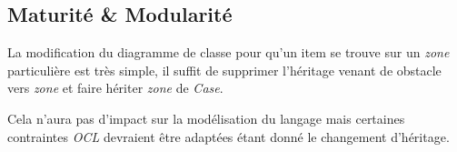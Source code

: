 
\subsection{Maturité & Modularité}
\label{sec:question-22}

La modification du diagramme de classe pour qu'un item se trouve sur un \emph{zone} particulière est très simple, il suffit de supprimer l'héritage venant de obstacle vers \emph{zone} et 
faire hériter \emph{zone} de \emph{Case}.

Cela n'aura pas d'impact sur la modélisation du langage mais certaines contraintes \emph{OCL} devraient être adaptées étant donné le changement d'héritage.